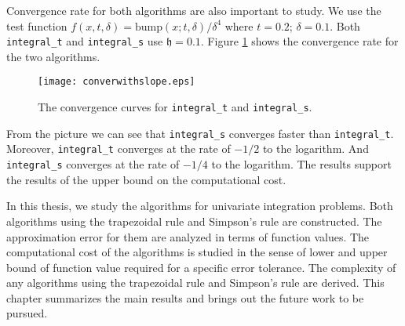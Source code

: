 \documentclass{iitthesis}
\theoremstyle{definition}
\theoremstyle{remark}
\begin{document}
Convergence rate for both algorithms are also important to study. We use the test function $f(x,t,\delta)= \text{bump}(x;t,\delta)/\delta^{4}$ where $t=0.2$; $\delta=0.1$. Both {\tt integral\_t} and {\tt integral\_s} use $\mathfrak{h}=0.1$. Figure \ref{fig:convergencerate} shows the convergence rate for the two algorithms.
\begin{figure}[ht]
\centering
\texttt{[image: converwithslope.eps]}
\caption{The convergence curves for {\tt integral\_t} and {\tt integral\_s}. \label{fig:convergencerate}}
\end{figure}

From the picture we can see that {\tt integral\_s} converges faster than {\tt integral\_t}. Moreover, {\tt integral\_t} converges at the rate of $-1/2$ to the logarithm. And {\tt integral\_s} converges at the rate of $-1/4$ to the logarithm. The results support the results of the upper bound on the computational cost.



In this thesis, we study the algorithms for univariate integration problems. Both algorithms using the trapezoidal rule and Simpson's rule are constructed. The approximation error for them are analyzed in terms of function values. The computational cost of the algorithms is studied in the sense of lower and upper bound of function value required for a specific error tolerance. The complexity of any algorithms using the trapezoidal rule and Simpson's rule are derived. This chapter summarizes the main results and brings out the future work to be pursued.


\end{document}
